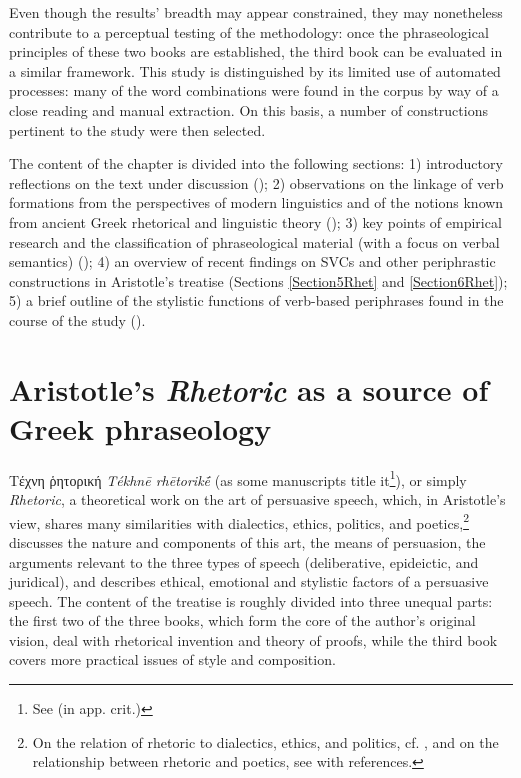 \documentclass[output=paper,colorlinks,citecolor=brown]{langscibook}
\begin{document}
Even though the results’ breadth may appear constrained, they may nonetheless contribute to a perceptual testing of the methodology: once the phraseological principles of these two books are established, the third book can be evaluated in a similar framework. This study is distinguished by its limited use of automated processes: many of the word combinations were found in the corpus by way of a close reading and manual extraction. On this basis, a number of constructions pertinent to the study were then selected.

The content of the chapter is divided into the following sections: 1) introductory reflections on the text under discussion (); 2) observations on the linkage of verb formations from the perspectives of modern linguistics and of the notions known from ancient Greek rhetorical and linguistic theory (); 3) key points of empirical research and the classification of phraseological material (with a focus on verbal semantics) (); 4) an overview of recent findings on SVCs and other periphrastic constructions in Aristotle’s treatise (Sections \ref{Section5Rhet} and \ref{Section6Rhet}); 5) a brief outline of the stylistic functions of verb-based periphrases found in the course of the study ().

\section{Aristotle’s \textit{Rhetoric} as a source of Greek phraseology}\label{Section2Rhet}

Τέχνη ῥητορική \textit{Τékhnē rhētorikḗ} (as some manuscripts title it\footnote{See \citet[3]{Kassel1976} (in app. crit.)}), or simply \textit{Rhetoric}, a theoretical work on the art of persuasive speech, which, in Aristotle’s view, shares many similarities with dialectics, ethics, politics, and poetics,\footnote{On the relation of rhetoric to dialectics, ethics, and politics, cf. , and on the relationship between rhetoric and poetics, see \citet{Kirby1991} with references.} discusses the nature and components of this art, the means of persuasion, the arguments relevant to the three types of speech (deliberative, epideictic, and juridical), and describes ethical, emotional and stylistic factors of a persuasive speech. The content of the treatise is roughly divided into three unequal parts: the first two of the three books, which form the core of the author’s original vision, deal with rhetorical invention and theory of proofs, while the third book covers more practical issues of style and composition.
\end{document}
